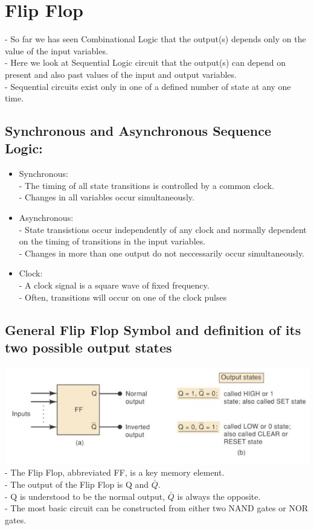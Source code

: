 \documentclass[12pt]{article}
\begin{document}
\section{Flip Flop}
- So far we has seen Combinational Logic that the output(s) depends only on the value of the input variables. \\
- Here we look at Sequential Logic circuit that the output(s) can depend on present and also past values of the input and output variables. \\
- Sequential circuits exist only in one of a defined number of state at any one time.
\subsection{Synchronous and Asynchronous Sequence Logic:}
\begin{itemize}
	\item Synchronous: \\
	- The timing of all state transitions is controlled by a common clock. \\
	- Changes in all variables occur simultaneously.
	\item Asynchronous: \\
	- State transistions occur independently of any clock and normally dependent on the timing of transitions in the input variables. \\
	- Changes in more than one output do not neccessarily occur simultaneously.
	\item Clock:\\
	- A clock signal is a square wave of fixed frequency. \\
	- Often, transitions will occur on one of the clock pulses
\end{itemize}
\subsection{General Flip Flop Symbol and definition of its two possible output states}
\includegraphics[scale = 0.75]{hinh6} \\
- The Flip Flop, abbreviated FF, is a key memory element.\\
- The output of the Flip Flop is Q and $\bar{Q}$. \\
- Q is understood to be the normal output, $\bar{Q}$ is always the opposite. \\
- The most basic circuit can be constructed from either two NAND gates or NOR gates.
\end{document}
